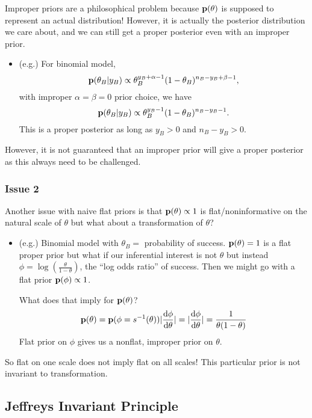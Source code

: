 Improper priors are a philosophical problem because ${\mathbf p}(\theta)$ is supposed to represent an actual distribution! However, it is actually the posterior distribution we care about, and we can still get a proper posterior even with an improper prior.
\begin{itemize}
    \item (e.g.) For binomial model,
    \[
        {\mathbf p}(\theta_B| y_B) \propto \theta_B^{y_B+\alpha-1}(1-\theta_B)^{n_B - y_B + \beta - 1},
    \]
    with improper $\alpha=\beta=0$ prior choice, we have
    \[ 
        {\mathbf p}(\theta_B|y_B) \propto \theta_B^{y_B-1} (1-\theta_B)^{n_B - y_B -1}.
    \]
    This is a proper posterior as long as $y_B > 0$ and $n_B - y_B > 0$.
\end{itemize}

However, it is not guaranteed that an improper prior will give a proper posterior as this always need to be challenged.

\subsubsection*{Issue 2}

Another issue with naive flat priors is that ${\mathbf p}(\theta) \propto 1$ is flat/noninformative on the natural scale of $\theta$ but what about a transformation of $\theta$?

\begin{itemize}
    \item (e.g.) Binomial model with $\theta_B = $ probability of success. ${\mathbf p}(\theta) = 1$  is a flat proper prior but what if our inferential interest is not $\theta$ but instead $\phi = \log(\frac{\theta}{1-\theta})$, the ``log odds ratio'' of success. Then we might go with a flat prior ${\mathbf p}(\phi) \propto 1$. 
    
    What does that imply for ${\mathbf p}(\theta)$?
    \[
     {\mathbf p}(\theta) = {\mathbf p}(\phi = s^{-1}(\theta))|\frac{\mathop{}\!\mathrm{d} \phi}{\mathop{}\!\mathrm{d} \theta}| = |\frac{\mathop{}\!\mathrm{d} \phi}{\mathop{}\!\mathrm{d} \theta}| = \frac{1}{\theta(1 - \theta)}
     \]
     Flat prior on $\phi$ gives us a nonflat, improper prior on $\theta$.
\end{itemize}

So flat on one scale does not imply flat on all scales! This particular prior is not invariant to transformation.

\subsection{Jeffreys Invariant Principle}

